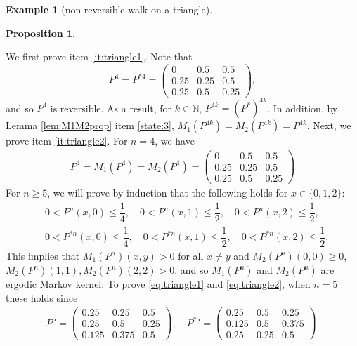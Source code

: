 \documentclass[12pt,a4]{amsart}
\numberwithin{equation}{section}
\theoremstyle{plain}
\newtheorem{proposition}{Proposition}[section]
\theoremstyle{definition}
\newtheorem{example}{Example}[section]
\theoremstyle{remark}
\let\oldendproof\endproof
\renewenvironment{proof}[1][\proofname]{%
  \oldproof[\noindent\textbf{#1.} ]%
}{\oldendproof}
\newcommand{\1}{\mathds{1}}
\renewcommand{\leq}{\leqslant}
\renewcommand{\geq}{\geqslant}
\begin{document}
\begin{example}[non-reversible walk on a triangle]
\begin{proposition}
\begin{enumerate}
		\end{enumerate}
	\end{proposition}
	\begin{proof}
		We first prove item \eqref{it:triangle1}. Note that
		$$P^4 = P^{*4} = \begin{pmatrix} 
		0 & 0.5 & 0.5 \\ 
		0.25 & 0.25 & 0.5 \\ 
		0.25 & 0.5 & 0.25  
		\end{pmatrix},$$
		and so $P^4$ is reversible. As a result, for $k \in \mathbb{N}$, $P^{4k} = (P^*)^{4k}$. In addition, by Lemma \ref{lem:M1M2prop} item \ref{state:3}, $M_1(P^{4k}) = M_2(P^{4k}) = P^{4k}$. Next, we prove item \eqref{it:triangle2}. For $n = 4$, we have
		\begin{align*}
		P^4 = M_1(P^4) = M_2(P^4) = \begin{pmatrix} 
		0 & 0.5 & 0.5 \\ 
		0.25 & 0.25 & 0.5 \\ 
		0.25 & 0.5 & 0.25  
		\end{pmatrix}
		\end{align*}
		For $n \geq 5$, we will prove by induction that the following holds for $x \in \{0,1,2\}$:
		\begin{align}
		&0 < P^n(x,0) \leq \dfrac{1}{4}, \quad 0 < P^n(x,1) \leq \dfrac{1}{2}, \quad 0 < P^n(x,2) \leq \dfrac{1}{2}, \label{eq:triangle1} \\
		&0 < P^{*n}(x,0) \leq \dfrac{1}{4}, \quad 0 < P^{*n}(x,1) \leq \dfrac{1}{2}, \quad 0 < P^{*n}(x,2) \leq \dfrac{1}{2}. \label{eq:triangle2}
		\end{align}
		This implies that $M_1(P^n)(x,y) > 0$ for all $x \neq y$ and $M_2(P^n)(0,0) \geq 0$, $M_2(P^n)(1,1), M_2(P^n)(2,2) > 0$, and so $M_1(P^n)$ and $M_2(P^n)$ are ergodic Markov kernel. To prove \eqref{eq:triangle1} and \eqref{eq:triangle2}, when $n = 5$ these holds since
		\begin{align*}
		P^5 = \begin{pmatrix} 
		0.25 & 0.25 & 0.5 \\ 
		0.25 & 0.5 & 0.25 \\ 
		0.125 & 0.375 & 0.5  
		\end{pmatrix}, \quad P^{*5} = \begin{pmatrix} 
		0.25 & 0.5 & 0.25 \\ 
		0.125 & 0.5 & 0.375 \\ 
		0.25 & 0.25 & 0.5  
		\end{pmatrix}.
		\end{align*}

\end{proof}
\end{example}
\end{document}
